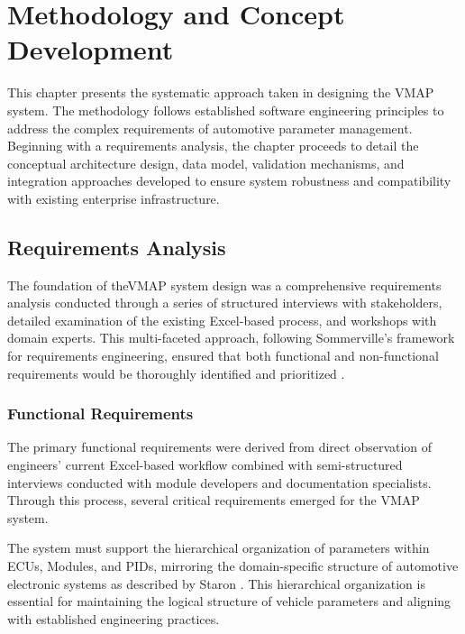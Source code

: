 \chapter{Methodology and Concept Development}
\label{chap:methodology}

This chapter presents the systematic approach taken in designing the \ac{VMAP} system. The methodology follows established software engineering principles to address the complex requirements of automotive parameter management. Beginning with a requirements analysis, the chapter proceeds to detail the conceptual architecture design, data model, validation mechanisms, and integration approaches developed to ensure system robustness and compatibility with existing enterprise infrastructure.

\section{Requirements Analysis}
\label{sec:requirements-analysis}

The foundation of the\ac{VMAP} system design was a comprehensive requirements analysis conducted through a series of structured interviews with stakeholders, detailed examination of the existing Excel-based process, and workshops with domain experts. This multi-faceted approach, following Sommerville's framework for requirements engineering, ensured that both functional and non-functional requirements would be thoroughly identified and prioritized \cite{sommerville2011software}.

\subsection{Functional Requirements}
\label{subsec:functional-requirements}

The primary functional requirements were derived from direct observation of engineers' current Excel-based workflow combined with semi-structured interviews conducted with module developers and documentation specialists. Through this process, several critical requirements emerged for the \ac{VMAP} system.

The system must support the hierarchical organization of parameters within \acp{ECU}, Modules, and \acp{PID}, mirroring the domain-specific structure of automotive electronic systems as described by Staron \cite{staron2021automotive}. This hierarchical organization is essential for maintaining the logical structure of vehicle parameters and aligning with established engineering practices.

